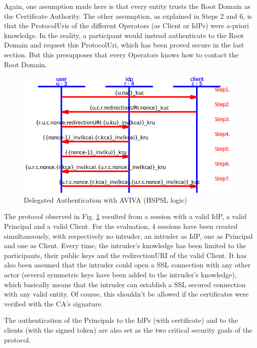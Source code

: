 Again, one assumption made here is that every entity trusts the Root Domain as the Certificate Authority. The other assumption, as explained in Steps 2 and 6, is that the ProtocolUris of the different Operators (as Client or IdPs) were a-priori knowledge. In the reality, a participant would instead authenticate to the Root Domain and request this ProtocolUri, which has been proved secure in the last section. But this presupposes that every Operators knows how to contact the Root Domain. 

\begin{figure}[!htbp]
	\centering
	\caption{Delegated Authentication with AVIVA (HSPSL logic)}
	\label{fig:AVIVA_delegated_auth}
	\includegraphics[width=1\textwidth]{images/prot_eva.png}
\end{figure}

The protocol observed in Fig. \ref{fig:AVIVA_delegated_auth} resulted from a session with a valid IdP, a valid Principal and a valid Client. For the evaluation, 4 sessions have been created simultaneously, with respectively no intruder, an intruder as IdP, one as Principal and one as Client. Every time, the intruder's knowledge has been limited to the participants, their public keys and the redirectionURI of the valid Client. It has also been assumed that the intruder could open a SSL connection with any other actor (several symmetric keys have been added to the intruder's knowledge), which basically means that the intruder can establish a SSL secured connection with any valid entity. Of course, this shouldn't be allowed if the certificates were verified with the CA's signature.

The authentication of the Principals to the IdPs (with certificate) and to the clients (with the signed token) are also set as the two critical security goals of the protocol.

